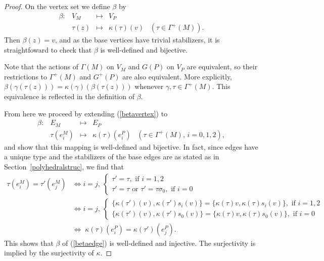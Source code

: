 \documentclass[12pt]{article}
\theoremstyle{definition}\newtheorem{definition}{Definition}[section]
\begin{document}
\begin{proof}
On the vertex set we define $\beta$ by
\begin{equation}
\label{betavertex}
\begin{array}{rlcl}
\beta:& V_M& \mapsto& V_P\\
&\tau(z)& \mapsto& \kappa(\tau)(v) \;\;\; (\tau\in \Gamma^+(M)).
\end{array}
\end{equation}
Then $\beta(z) = v$, and as the base vertices have trivial stabilizers, it is straightfoward to check that $\beta$ is well-defined and bijective. 
\smallskip

Note that the actions of $\Gamma(M)$ on $V_M$ and $G(P)$ on $V_P$ are equivalent, so their restrictions to $\Gamma^+(M)$ and $G^+(P)$ are also equivalent. More explicitly, $\beta(\gamma(\tau(z))) = \kappa(\gamma)(\beta(\tau(z)))$ whenever $\gamma,\tau\in\Gamma^{+}(M)$. This equivalence is reflected in the definition of $\beta$. \smallskip 

From here we proceed by extending (\ref{betavertex}) to 
\begin{equation}
\label{betaedge}
\begin{array}{rlcl}
\beta:& E_M& \mapsto& E_P\\
&\tau(e_i^M)& \mapsto& \kappa(\tau)(e_i^P) \;\;\; (\tau\in \Gamma^+(M),\, i=0,1,2),
\end{array}
\end{equation}
and show that this mapping is well-defined and bijective. In fact, since edges have a unique type and the stabilizers of the base edges are as stated as in Section~\ref{polyhedralstruc}, we find that   
\begin{equation}
\begin{aligned}\nonumber
    \tau(e_i^M) = \tau'(e_j^M)  
    &\iff i=j, \  \begin{cases}
        \tau'=\tau, \text{ if } i=1,2 \\   
        \tau' = \tau \text{ or } \tau' = \tau \sigma_0, \text{ if } i=0
    \end{cases} \\[.03in]
    &\iff i=j, \  \begin{cases}
        \{\kappa(\tau')(v), \kappa(\tau')s_i(v)\} = \{\kappa(\tau)v,\kappa(\tau)s_i(v)\} , \text{ if } i=1,2 \\
        \{\kappa(\tau')(v), \kappa(\tau')s_0(v)\} = \{\kappa(\tau)v,\kappa(\tau)s_0(v)\}, \text{ if } i=0
    \end{cases} \\[.03in] 
    &\iff\; \kappa(\tau)(e_i^P) = \kappa(\tau')(e_j^P).
\end{aligned}
\end{equation}
This shows that $\beta$ of (\ref{betaedge}) is well-defined and injective. 
The surjectivity is implied by the surjectivity of $\kappa$. \smallskip


\end{proof}
\end{document}
